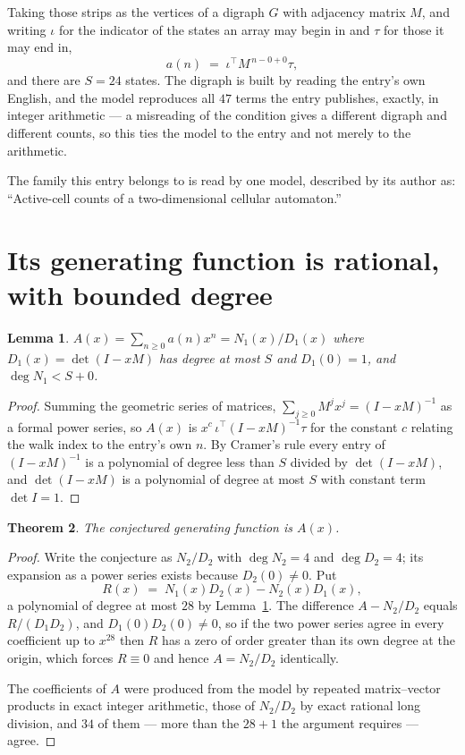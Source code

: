 \documentclass[11pt,a4paper]{article}
\theoremstyle{plain}
\newtheorem{theorem}{Theorem}
\newtheorem{lemma}[theorem]{Lemma}
\theoremstyle{definition}
\begin{document}
Taking those strips as the vertices of a digraph $G$ with adjacency matrix $M$, and writing
$\iota$ for the indicator of the states an array may begin in and $\tau$ for those it may end
in,
\[
a(n)\;=\;\iota^{\!\top}M^{\,n-0+0}\tau ,
\]
and there are $S=24$ states. The digraph is built by reading the entry's own English, and the
model reproduces all $47$ terms the entry publishes, exactly, in integer arithmetic --- a
misreading of the condition gives a different digraph and different counts, so this ties the
model to the entry and not merely to the arithmetic.

The family this entry belongs to is read by one model, described by its author as: ``Active-cell counts of a two-dimensional cellular automaton.''


\section{Its generating function is rational, with bounded degree}

\begin{lemma}\label{lem:rat}
$A(x)=\sum_{n\ge0}a(n)x^n=N_1(x)/D_1(x)$ where $D_1(x)=\det(I-xM)$ has degree at most
$S$ and $D_1(0)=1$, and $\deg N_1<S+0$.
\end{lemma}

\begin{proof}
Summing the geometric series of matrices, $\sum_{j\ge0}M^jx^j=(I-xM)^{-1}$ as a formal
power series, so $A(x)$ is $x^{c}\,\iota^{\!\top}(I-xM)^{-1}\tau$ for the constant $c$
relating the walk index to the entry's own $n$. By Cramer's rule every entry of
$(I-xM)^{-1}$ is a polynomial of degree less than $S$ divided by $\det(I-xM)$, and
$\det(I-xM)$ is a polynomial of degree at most $S$ with constant term $\det I=1$.
\end{proof}

\begin{theorem}
The conjectured generating function is $A(x)$.
\end{theorem}

\begin{proof}
Write the conjecture as $N_2/D_2$ with $\deg N_2=4$ and $\deg D_2=4$; its expansion as a
power series exists because $D_2(0)\neq0$. Put
\[
R(x)\;=\;N_1(x)D_2(x)-N_2(x)D_1(x),
\]
a polynomial of degree at most $28$ by Lemma~\ref{lem:rat}. The difference
$A-N_2/D_2$ equals $R/(D_1D_2)$, and $D_1(0)D_2(0)\neq0$, so if the two power series agree in
every coefficient up to $x^{28}$ then $R$ has a zero of order greater than its own
degree at the origin, which forces $R\equiv0$ and hence $A=N_2/D_2$ identically.

The coefficients of $A$ were produced from the model by repeated matrix--vector products in
exact integer arithmetic, those of $N_2/D_2$ by exact rational long division, and $34$
of them --- more than the $28+1$ the argument requires --- agree.
\end{proof}
\end{document}
